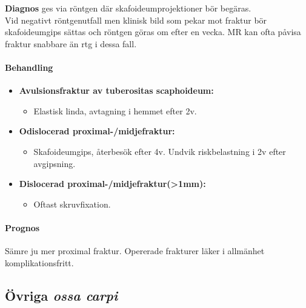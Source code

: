 \documentclass[
  letterpaper,
  DIV=11,
  numbers=noendperiod]{scrreport}
\let\oldparagraph\paragraph
\renewcommand{\paragraph}[1]{\oldparagraph{#1}\mbox{}}
\providecommand{\tightlist}{%
  \setlength{\itemsep}{0pt}\setlength{\parskip}{0pt}}\usepackage{longtable,booktabs,array}
\begin{document}
\textbf{Diagnos} ges via röntgen där skafoideumprojektioner bör
begäras.\\
Vid negativt röntgenutfall men klinisk bild som pekar mot fraktur bör
skafoideumgips sättas och röntgen göras om efter en vecka. MR kan ofta
påvisa fraktur snabbare än rtg i dessa fall.

\hypertarget{behandling-7}{%
\paragraph{Behandling}\label{behandling-7}}

\begin{itemize}
\tightlist
\item
  \textbf{Avulsionsfraktur av tuberositas scaphoideum:}

  \begin{itemize}
  \tightlist
  \item
    Elastisk linda, avtagning i hemmet efter 2v.
  \end{itemize}
\item
  \textbf{Odislocerad proximal-/midjefraktur:}

  \begin{itemize}
  \tightlist
  \item
    Skafoideumgips, återbesök efter 4v. Undvik riskbelastning i 2v efter
    avgipsning.
  \end{itemize}
\item
  \textbf{Dislocerad proximal-/midjefraktur(\textgreater1mm):}

  \begin{itemize}
  \tightlist
  \item
    Oftast skruvfixation.
  \end{itemize}
\end{itemize}

\hypertarget{prognos-6}{%
\paragraph{Prognos}\label{prognos-6}}

Sämre ju mer proximal fraktur. Opererade frakturer läker i allmänhet
komplikationsfritt.

\hypertarget{uxf6vriga-ossa-carpi}{%
\subsection{\texorpdfstring{Övriga \emph{ossa
carpi}}{Övriga ossa carpi}}\label{uxf6vriga-ossa-carpi}}
\end{document}
